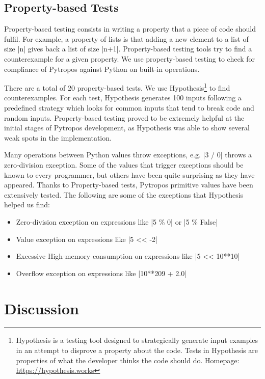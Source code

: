 \subsection{Property-based Tests}\label{property-based-tests}

Property-based testing consists in writing a property that a piece of code should fulfil.
For example, a property of lists is that adding a new element to a list of size \pycode|n|
gives back a list of size \pycode|n+1|. Property-based testing tools try to find a
counterexample for a given property. We use property-based testing to check for compliance
of Pytropos against Python on built-in operations.

There are a total of 20 property-based tests. We use Hypothesis\footnote{Hypothesis is a
  testing tool designed to strategically generate input examples in an attempt to disprove
  a property about the code. Tests in Hypothesis are properties of what the developer
  thinks the code should do. Homepage: \url{https://hypothesis.works}}
to find counterexamples. For each test, Hypothesis
generates 100 inputs following a predefined strategy which looks for common inputs that
tend to break code and random inputs. Property-based testing proved to be extremely
helpful at the initial stages of Pytropos development, as Hypothesis was able to show
several weak spots in the implementation.

Many operations between Python values throw exceptions, e.g. \pycode|3 / 0| throws a
zero-division exception. Some of the values that trigger exceptions should be known to
every programmer, but others have been quite surprising as they have appeared. Thanks to
Property-based tests, Pytropos primitive values have been extensively tested. The following
are some of the exceptions that Hypothesis helped us find:

\begin{itemize}
\tightlist
\item Zero-division exception on expressions like \pycode|5 \% 0| or \pycode|5 \% False|
\item Value exception on expressions like \pycode|5 << -2|
\item Excessive High-memory consumption on expressions like \pycode|5 << 10**10|
\item Overflow exception on expressions like \pycode|10**209 + 2.0|
\end{itemize}

\section{Discussion}\label{discussion}

